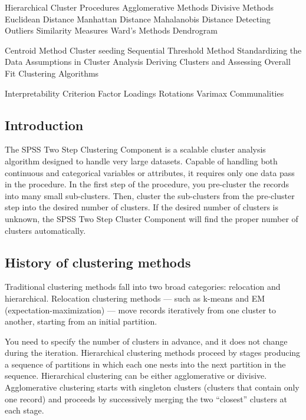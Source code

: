 Hierarchical Cluster Procedures
Agglomerative Methods
Divisive Methods
Euclidean Distance
Manhattan Distance
Mahalanobis Distance
Detecting Outliers
Similarity Measures
Ward's Methods
Dendrogram

Centroid Method
Cluster seeding
Sequential Threshold Method
Standardizing the Data
Assumptions in Cluster Analysis
Deriving Clusters and Assessing Overall Fit
Clustering Algorithms


Interpretability Criterion
Factor Loadings
Rotations
Varimax
Communalities




\subsection{Introduction}

The SPSS Two Step Clustering Component is a scalable cluster analysis algorithm designed
to handle very large datasets. Capable of handling both continuous and categorical variables
or attributes, it requires only one data pass in the procedure. In the first step of the
procedure, you pre-cluster the records into many small sub-clusters. Then, cluster the
sub-clusters from the pre-cluster step into the desired number of clusters. If the desired
number of clusters is unknown, the SPSS Two Step Cluster Component will find the proper
number of clusters automatically.


\subsection{History of clustering methods}
Traditional clustering methods fall into two broad categories: relocation and hierarchical.
Relocation clustering methods — such as k-means and EM (expectation-maximization) —
move records iteratively from one cluster to another, starting from an initial partition.

You need to specify the number of clusters in advance, and it does not change during the iteration. Hierarchical clustering methods proceed by stages producing a sequence of
partitions in which each one nests into the next partition in the sequence. Hierarchical clustering can be either agglomerative or divisive. Agglomerative clustering starts with
singleton clusters (clusters that contain only one record) and proceeds by successively merging the two “closest” clusters at each stage. 

